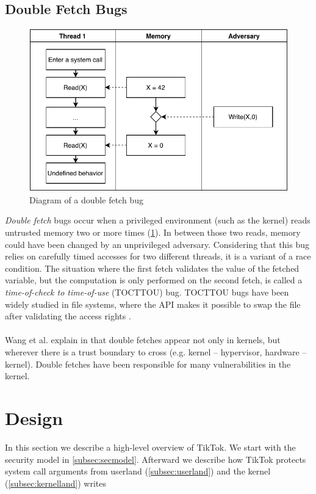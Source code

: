 \subsection{Double Fetch Bugs}

\label{subsec:doublefetch}

\begin{figure}[]
  \centering
  \includegraphics[width=.85\linewidth]{img/doublefetch.pdf}
  \caption{Diagram of a double fetch bug}
  \label{fig:doublefetch}
\end{figure}

\emph{Double fetch} bugs occur when a privileged environment (such as the 
kernel) reads untrusted memory two or more times (\cref{fig:doublefetch}). 
In between those two reads, memory could have been changed by an unprivileged
adversary. Considering that this bug relies on carefully timed accesses
for two different threads, it is a variant of a race condition. The situation
where the first fetch validates the value of the fetched variable, 
but the computation is only performed on the second fetch, is called a 
\emph{time-of-check to time-of-use} (TOCTTOU) bug. TOCTTOU bugs have been
widely studied in file systems, where the API makes it possible to swap the file
after validating the access rights \cite{payer2012protecting,
pu2006methodical, wei2010modeling, tsafrir2008portably}.
\\
\\
Wang et al. explain in \cite{wang2018survey} that double fetches appear not only
in kernels, but wherever there is a trust boundary to cross (e.g. kernel -- 
hypervisor, hardware -- kernel). Double fetches have been responsible for many
vulnerabilities in the kernel.


\section{Design}
\label{sec:design}
In this section we describe a high-level overview of TikTok. We start with the security model in \cref{subsec:secmodel}.
Afterward we describe how TikTok protects system call arguments from userland (\cref{subsec:userland}) and the kernel 
(\cref{subsec:kernelland}) writes

